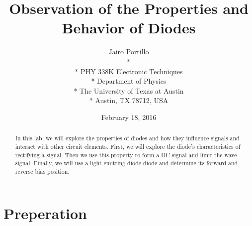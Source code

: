 \documentclass[11pt,letterpaper,onecolumn]{article}
\begin{document}

\title{\bf Observation of the Properties and Behavior of Diodes}

\author{
 Jairo Portillo \\*
  \\*
 PHY 338K Electronic Techniques \\*
 Department of Physics \\*
 The University of Texas at Austin \\*
 Austin, TX 78712, USA
}
\date{February 18, 2016}


\maketitle


\begin{abstract}

In this lab, we will explore the properties of diodes and how they influence signals and interact with other circuit elements. First, we will explore the diode's characteristics of rectifying a signal. Then we use this property to form a DC signal and limit the wave signal. Finally, we will use a light emitting diode diode and determine its forward and reverse bias position.   

\end{abstract}



\section{Preperation}
\end{document}
